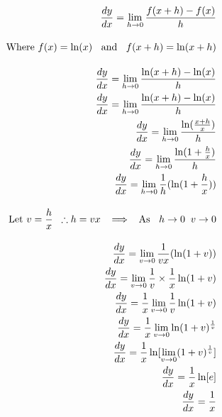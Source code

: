 \documentclass[12pt letter]{report}
\begin{document}
\begin{myproof}
	\begingroup
	\allowdisplaybreaks
	\begin{align*}
		\frac{dy}{dx} = \lim_{h \to 0} \frac{f(x+h) - f(x)}{h}                                                    \\[10pt]
		\text{Where } f(x) = \ln(x) \;\; \text{ and } \;\; f(x+h) = \ln(x+h)                                      \\[10pt]
		\frac{dy}{dx} = \lim_{h \to 0} \frac{\ln(x+h) - \ln(x)}{h}                                                \\
		\frac{dy}{dx} = \lim_{h \to 0} \frac{\ln(x+h) - \ln(x)}{h}                                                \\
		\frac{dy}{dx} = \lim_{h \to 0} \frac{\ln(\frac{x+h}{x})}{h}                                               \\
		\frac{dy}{dx} = \lim_{h \to 0} \frac{\ln(1+\frac{h}{x})}{h}                                               \\
		\frac{dy}{dx} = \lim_{h \to 0} \frac{1}{h}(\ln(1+\frac{h}{x}))                                            \\[10pt]
		\text{Let } v = \frac{h}{x} \;\; \therefore h = vx \;\; \implies \;\; \text{As } \;\; h\to 0 \;\; v \to 0 \\[10pt]
		\pagebreak
		\frac{dy}{dx} = \lim_{v \to 0} \frac{1}{vx}(\ln(1+v))                                                     \\
		\frac{dy}{dx} = \lim_{v \to 0} \frac{1}{v}  \times \frac{1}{x}\ln(1+v)                                    \\
		\frac{dy}{dx} = \frac{1}{x} \lim_{v \to 0} \frac{1}{v} \ln(1+v)                                           \\
		\frac{dy}{dx}= \frac{1}{x} \lim_{v \to 0} \ln(1+v)^{\frac{1}{v}}                                          \\
		\frac{dy}{dx} = \frac{1}{x}\ln[\lim_{v \to 0} (1+v)^{\frac{1}{v}} ]                                       \\
		\frac{dy}{dx} = \frac{1}{x}\ln[e]                                                                         \\
		\frac{dy}{dx} = \frac{1}{x}                                                                               \\
	\end{align*}
	\endgroup
\end{myproof}
\end{document}
